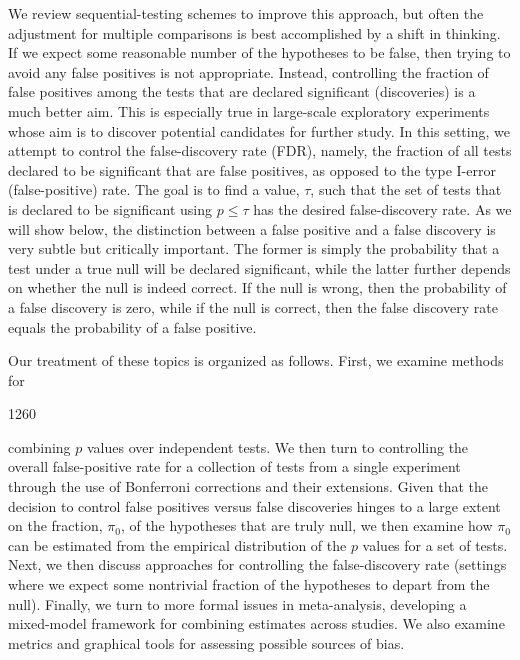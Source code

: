 \documentclass{article}
\begin{document}
We review sequential-testing schemes to improve this approach, but often the adjustment for multiple comparisons is best accomplished by a shift in thinking. If we expect some reasonable number of the hypotheses to be false, then trying to avoid any false positives is not appropriate. Instead, controlling the fraction of false positives among the tests that are declared significant (discoveries) is a much better aim. This is especially true in large-scale exploratory experiments whose aim is to discover potential candidates for further study. In this setting, we attempt to control the false-discovery rate (FDR), namely, the fraction of all tests declared to be significant that are false positives, as opposed to the type I-error (false-positive) rate. The goal is to find a value,  $ \tau $, such that the set of tests that is declared to be significant using  $ p \leq \tau $ has the desired false-discovery rate. As we will show below, the distinction between a false positive and a false discovery is very subtle but critically important. The former is simply the probability that a test under a true null will be declared significant, while the latter further depends on whether the null is indeed correct. If the null is wrong, then the probability of a false discovery is zero, while if the null is correct, then the false discovery rate equals the probability of a false positive.

Our treatment of these topics is organized as follows. First, we examine methods for

1260

combining $p$ values over independent tests. We then turn to controlling the overall false-positive rate for a collection of tests from a single experiment through the use of Bonferroni corrections and their extensions. Given that the decision to control false positives versus false discoveries hinges to a large extent on the fraction, $\pi_0$, of the hypotheses that are truly null, we then examine how $\pi_0$ can be estimated from the empirical distribution of the $p$ values for a set of tests. Next, we then discuss approaches for controlling the false-discovery rate (settings where we expect some nontrivial fraction of the hypotheses to depart from the null). Finally, we turn to more formal issues in meta-analysis, developing a mixed-model framework for combining estimates across studies. We also examine metrics and graphical tools for assessing possible sources of bias.
\end{document}
